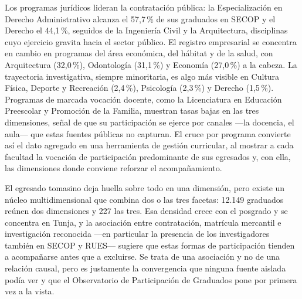 Los programas jurídicos lideran la contratación pública: la Especialización en Derecho Administrativo alcanza el 57,7\,\% de sus graduados en SECOP y el Derecho el 44,1\,\%, seguidos de la Ingeniería Civil y la Arquitectura, disciplinas cuyo ejercicio gravita hacia el sector público. El registro empresarial se concentra en cambio en programas del área económica, del hábitat y de la salud, con Arquitectura (32,0\,\%), Odontología (31,1\,\%) y Economía (27,0\,\%) a la cabeza. La trayectoria investigativa, siempre minoritaria, es algo más visible en Cultura Física, Deporte y Recreación (2,4\,\%), Psicología (2,3\,\%) y Derecho (1,5\,\%). Programas de marcada vocación docente, como la Licenciatura en Educación Preescolar y Promoción de la Familia, muestran tasas bajas en las tres dimensiones, señal de que su participación se ejerce por canales ---la docencia, el aula--- que estas fuentes públicas no capturan. El cruce por programa convierte así el dato agregado en una herramienta de gestión curricular, al mostrar a cada facultad la vocación de participación predominante de sus egresados y, con ella, las dimensiones donde conviene reforzar el acompañamiento.

\begin{cajahallazgo}
El egresado tomasino deja huella sobre todo en una dimensión, pero existe un núcleo multidimensional que combina dos o las tres facetas: 12.149 graduados reúnen dos dimensiones y 227 las tres. Esa densidad crece con el posgrado y se concentra en Tunja, y la asociación entre contratación, matrícula mercantil e investigación reconocida ---en particular la presencia de los investigadores también en SECOP y RUES--- sugiere que estas formas de participación tienden a acompañarse antes que a excluirse. Se trata de una asociación y no de una relación causal, pero es justamente la convergencia que ninguna fuente aislada podía ver y que el Observatorio de Participación de Graduados pone por primera vez a la vista.
\end{cajahallazgo}
